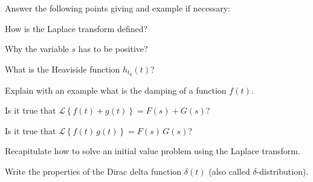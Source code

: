 {
Answer the following points giving and example if necessary:
\begin{iii}
\item How is the Laplace transform defined?
\item Why the variable $s$ has to be positive?
\item What is the Heaviside function $h_{t_0}(t)$?
\item Explain with an example what is the damping of a function $f(t)$.
\item Is it true that $\mathcal{L}\left\{f(t)+g(t)\right\} = F(s)+G(s)$?
\item Is it true that $\mathcal{L}\left\{f(t)\,g(t)\right\} = F(s)\,G(s)$?
\item Recapitulate how to solve an initial value problem using the Laplace transform.
\item Write the properties of the Dirac delta function $\delta(t)$ (also called $\delta$-distribution).
\end{iii}
}


